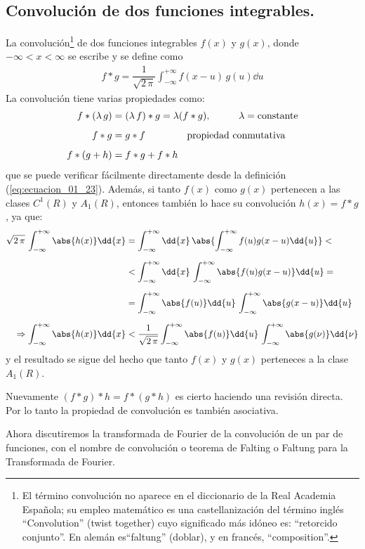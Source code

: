 \subsection{Convolución de dos funciones integrables.}

La convolución\footnote{El término convolución no aparece en el diccionario de la Real Academia Española; su empleo matemático es una castellanización del término inglés \enquote{Convolution} (twist together) cuyo significado más idóneo es: \enquote{retorcido conjunto}. En alemán es\enquote{faltung} (doblar), y en francés, \enquote{composition}.} de dos funciones integrables $f(x)$ y $g(x)$, donde \hfill \break
$-\infty < x < \infty$ se escribe y se define como
\begin{align}
f * g = \dfrac{1}{\sqrt{2 \, \pi}} \int_{-\infty}^{+\infty} f(x - u) \, g(u) \dd{u}
\label{eq:ecuacion_01_23}
\end{align}
La convolución tiene varias propiedades como:
\begin{align*}
f * (\lambda \, g) &= (\lambda \, f) * g = \lambda (f * g), \hspace{1cm} \lambda = \mbox{constante} \\[0.5em]
f * g &= g * f \hspace{1.5cm} \mbox{propiedad conmutativa} \\[0.5em]
f * (g + h) &= f * g + f * h
\end{align*}
que se puede verificar fácilmente directamente desde la definición (\ref{eq:ecuacion_01_23}). \hfill \break 
Además, si tanto $f (x)$ como $g (x)$ pertenecen a las clases $C^{1} (R)$ y $A_{1} (R)$, entonces también lo hace su convolución $h (x) = f * g$, ya que:
\begin{align*}
\sqrt{2 \, \pi} \, \int_{-\infty}^{+\infty} \abs{h(x)} \dd{x} &= \int_{-\infty}^{+\infty} \dd{x} \, \abs{\int_{-\infty}^{+\infty} f(u) g(x - u) \dd{u}} < \\[0.5em]
&< \int_{-\infty}^{+\infty} \dd{x} \, \int_{-\infty}^{+\infty} \abs{f(u) g(x - u)} \dd{u} = \\[0.5em]
&= \int_{-\infty}^{+\infty} \abs{f(u)} \dd{u} \, \int_{-\infty}^{+\infty} \abs{g(x - u)} \dd{u} \\[0.5em]
\Rightarrow \int_{-\infty}^{+\infty} \abs{h(x)} \dd{x} &< \dfrac{1}{\sqrt{2 \, \pi}} \int_{-\infty}^{+\infty} \abs{f(u)} \dd{u} \, \int_{-\infty}^{+\infty} \abs{g(\nu)} \dd{\nu}
\end{align*}
y el resultado se sigue del hecho que tanto $f(x)$ y $g(x)$ perteneces a la clase $A_{1}(R)$.
\par
Nuevamente $(f * g) * h = f * (g * h)$ es cierto haciendo una revisión directa. Por lo tanto la propiedad de convolución es también asociativa.
\par
Ahora discutiremos la transformada de Fourier de la convolución de un par de funciones, con el nombre de convolución o teorema de Falting o Faltung para la Transformada de Fourier.

